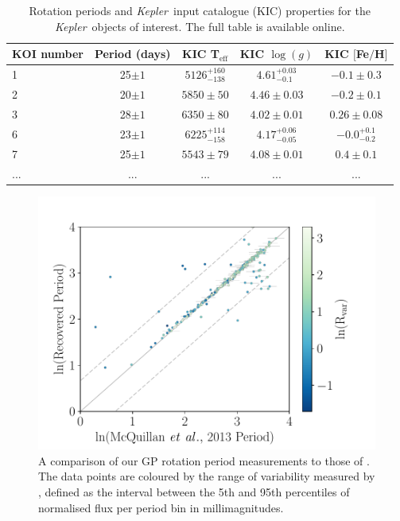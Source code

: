 \documentclass[a4paper,fleqn,usenatbib,useAMS]{mnras}
\newcommand{\Kepler}{{\it Kepler}}
\begin{document}
\begin{table}
\begin{center}
    \caption{Rotation periods and \Kepler\ input catalogue (KIC) properties
    for the \Kepler\ objects of interest. The full table is available online.}
\begin{tabular}{lcccc}
    KOI number & Period (days) & KIC T$_{\mathrm{eff}}$ & KIC $\log(g)$ & KIC
    $[$Fe$/$H$]$ \\
    \hline
    1 & 25$\pm1$ & $5126^{+160}_{-138}$ & $4.61^{+0.03}_{-0.1}$ &
    $-0.1\pm0.3$ \\
    2 & 20$\pm1$ & $5850\pm50$ & $4.46\pm0.03$ & $-0.2\pm0.1$ \\
    3 & 28$\pm1$ & $6350\pm80$ & $4.02\pm0.01$ & $0.26\pm0.08$\\
    6 & 23$\pm1$ & $6225^{+114}_{-158}$ & $4.17^{+0.06}_{-0.05}$ &
    $-0.0^{+0.1}_{-0.2}$\\
    7 & 25$\pm1$ & $5543\pm79 $ & $4.08\pm0.01$ & $0.4\pm0.1$ \\
    ... & ... & ... & ... & ... \\
\end{tabular}
\end{center}
\end{table}
\label{tab:koi_periods}

\begin{figure}
\begin{center}
\includegraphics[width=6in, clip=true]{figures/comparison_koi_02_03.pdf}
\caption[Comparison with McQuillan results.]
{A comparison of our GP rotation period measurements to those of
\citet{Mcquillan2013}.
The data points are coloured by the range of variability measured by
    \citet{Mcquillan2013}, defined as the interval between the 5th and 95th
    percentiles of normalised flux per period bin in millimagnitudes.}
\label{fig:mcquillan}
\end{center}
\end{figure}
\end{document}
